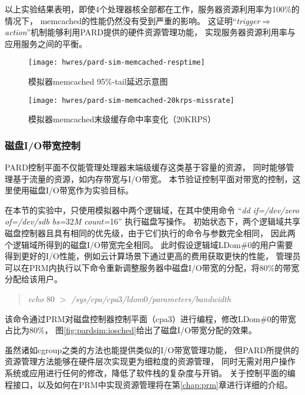 以上实验结果表明，即使4个处理器核全部都在工作，服务器资源利用率为100\%的情况下，
memcached的性能仍然没有受到严重的影响。
这证明``\emph{trigger$\Rightarrow$action}''机制能够利用PARD提供的硬件资源管理功能，
实现服务器资源利用率与应用服务之间的平衡。

\begin{figure}[tb]
\begin{minipage}{0.48\textwidth}
  \centering
  \texttt{[image: hwres/pard-sim-memcached-resptime]}
  \caption{模拟器memcached 95\%-tail延迟示意图}
  \label{fig:pardsim:memcached-resptime}
\end{minipage}\hfill
\begin{minipage}{0.48\textwidth}
  \centering
  \texttt{[image: hwres/pard-sim-memcached-20krps-missrate]}
  \caption{模拟器memcached末级缓存命中率变化（20KRPS）}
  \label{fig:pardsim:memcached-20krps-missrate}
\end{minipage}
\end{figure}


\subsubsection{磁盘I/O带宽控制}

PARD控制平面不仅能管理处理器末端级缓存这类基于容量的资源，
同时能够管理基于流量的资源，如内存带宽与I/O带宽。
本节验证控制平面对带宽的控制，这里使用磁盘I/O带宽作为实验目标。

在本节的实验中，只使用模拟器中两个逻辑域，在其中使用命令
``\textit{dd if=/dev/zero of=/dev/sdb bs=}32\textit{M count=}16''
执行磁盘写操作。
初始状态下，两个逻辑域共享磁盘控制器且具有相同的优先级，由于它们执行的命令与参数完全相同，
因此两个逻辑域所得到的磁盘I/O带宽完全相同。
此时假设逻辑域LDom\#0的用户需要得到更好的I/O性能，例如云计算场景下通过更高的费用获取更快的性能，
管理员可以在PRM内执行以下命令重新调整服务器中磁盘I/O带宽的分配，将80\%的带宽分配给该用户。
\begin{verse}
\textit{echo} 80 \textit{$>$ /sys/cpa/cpa}3\textit{/ldom}0\textit{/parameters/bandwidth}
\end{verse}

该命令通过PRM对磁盘控制器控制平面（cpa3）进行编程，修改LDom\#0的带宽占比为80\%，
图\ref{fig:pardsim:iosched}给出了磁盘I/O带宽分配的效果。

虽然诸如cgroup\cite{cgroup}之类的方法也能提供类似的I/O带宽管理功能，
但PARD所提供的资源管理方法能够在硬件层次实现更为细粒度的资源管理，
同时无需对用户操作系统或应用进行任何的修改，降低了软件栈的复杂度与开销。
关于控制平面的编程接口，以及如何在PRM中实现资源管理将在第\ref{chap:prm}章进行详细的介绍。

